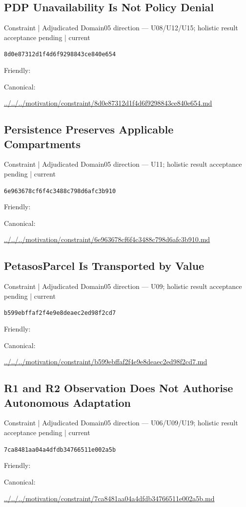 \documentclass[10pt,a4paper]{article}
\begin{document}
\subsection*{PDP Unavailability Is Not Policy Denial}
{\small Constraint | Adjudicated Domain05 direction — U08/U12/U15; holistic result acceptance pending | current}\par
\texttt{8d0e87312d1f4d6f9298843ce840e654}\par
Friendly: \par
Canonical: \par
{\footnotesize\url{../../../motivation/constraint/8d0e87312d1f4d6f9298843ce840e654.md}}\par
\subsection*{Persistence Preserves Applicable Compartments}
{\small Constraint | Adjudicated Domain05 direction — U11; holistic result acceptance pending | current}\par
\texttt{6e963678cf6f4c3488c798d6afc3b910}\par
Friendly: \par
Canonical: \par
{\footnotesize\url{../../../motivation/constraint/6e963678cf6f4c3488c798d6afc3b910.md}}\par
\subsection*{PetasosParcel Is Transported by Value}
{\small Constraint | Adjudicated Domain05 direction — U09; holistic result acceptance pending | current}\par
\texttt{b599ebffaf2f4e9e8deaec2ed98f2cd7}\par
Friendly: \par
Canonical: \par
{\footnotesize\url{../../../motivation/constraint/b599ebffaf2f4e9e8deaec2ed98f2cd7.md}}\par
\subsection*{R1 and R2 Observation Does Not Authorise Autonomous Adaptation}
{\small Constraint | Adjudicated Domain05 direction — U06/U09/U19; holistic result acceptance pending | current}\par
\texttt{7ca8481aa04a4dfdb34766511e002a5b}\par
Friendly: \par
Canonical: \par
{\footnotesize\url{../../../motivation/constraint/7ca8481aa04a4dfdb34766511e002a5b.md}}\par
\end{document}
